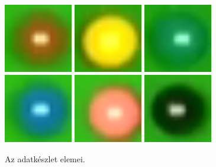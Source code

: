 \begin{figure}[!ht]
    \centering
    \includegraphics[width=30mm, keepaspectratio]{figures/dataset_1.png}\hspace{2mm}
    \includegraphics[width=30mm, keepaspectratio]{figures/dataset_2.png}\hspace{2mm}
	\includegraphics[width=30mm, keepaspectratio]{figures/dataset_3.png}\\\vspace{2mm}
    \includegraphics[width=30mm, keepaspectratio]{figures/dataset_4.png}\hspace{2mm}
    \includegraphics[width=30mm, keepaspectratio]{figures/dataset_5.png}\hspace{2mm}
	\includegraphics[width=30mm, keepaspectratio]{figures/dataset_6.png}\\\vspace{2mm}
    \caption{Az adatkészlet elemei.}
    \label{fig:adatkeszlet}
\end{figure}

